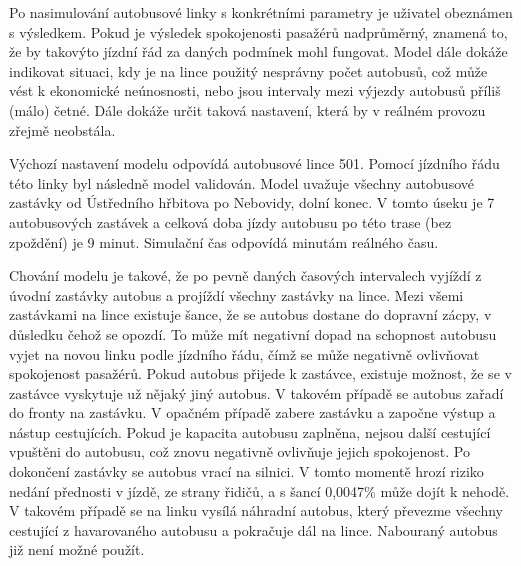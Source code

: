 \documentclass[a4paper]{article}
\begin{document}
         \begin{table}[H]
   			\centering
   			\caption{Ovlivnění celkové spokojenosti v závislosti na daném jevu (za každého jednoho pasažéra). Každý aspekt má jednu až dvě hodnoty. V případě dvou hodnot je konkrétní hodnota vybrána z dostupných variant náhodně pro každého pasažéra.}
   			\label{}
   		\end{table}
   		
     	Po nasimulování autobusové linky s konkrétními parametry je uživatel obeznámen s výsledkem. Pokud je výsledek spokojenosti pasažérů nadprůměrný, znamená to, že by takovýto jízdní řád za daných podmínek mohl fungovat. Model dále dokáže indikovat situaci, kdy je na lince použitý nesprávny počet autobusů, což může vést k ekonomické neúnosnosti, nebo jsou intervaly mezi výjezdy autobusů příliš (málo) četné. Dále dokáže určit taková nastavení, která by v reálném provozu zřejmě neobstála.
   		
   		Výchozí nastavení modelu odpovídá autobusové lince 501. Pomocí jízdního řádu této linky byl následně model validován. 
 		Model uvažuje všechny autobusové zastávky od Ústředního hřbitova po Nebovidy, dolní konec. V tomto úseku je 7 autobusových zastávek a celková doba jízdy autobusu po této trase (bez zpoždění) je 9 minut. Simulační čas odpovídá minutám reálného času. 
 		
 		Chování modelu je takové, že po pevně daných časových intervalech vyjíždí z úvodní zastávky autobus a projíždí všechny zastávky na lince. Mezi všemi zastávkami na lince existuje šance, že se autobus dostane do dopravní zácpy, v důsledku čehož se opozdí. To může mít negativní dopad na schopnost autobusu vyjet na novou linku podle jízdního řádu, čímž se může negativně ovlivňovat spokojenost pasažérů. Pokud autobus přijede k zastávce, existuje možnost, že se v zastávce vyskytuje už nějaký jiný autobus. V takovém případě se autobus zařadí do fronty na zastávku. V opačném případě zabere zastávku a započne výstup a nástup cestujících. Pokud je kapacita autobusu zaplněna, nejsou další cestující vpuštěni do autobusu, což znovu negativně ovlivňuje jejich spokojenost. Po dokončení zastávky se autobus vrací na silnici. V tomto momentě hrozí riziko nedání přednosti v jízdě, ze strany řidičů, a s šancí 0,0047\% může dojít k nehodě.
 		V takovém případě se na linku vysílá náhradní autobus, který převezme všechny cestující z havarovaného autobusu a pokračuje dál na lince. Nabouraný autobus již není možné použít.
 		
\end{document}
